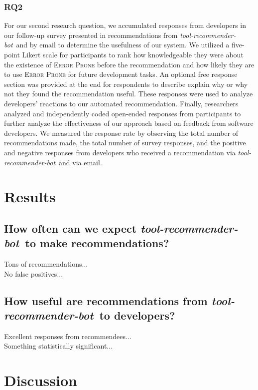 \documentclass[sigconf,review,anonymous]{acmart}
\newcommand{\tool}{\textsl{tool-recommender-bot}}
\begin{document}
\subsubsection{RQ2}

For our second research question, we accumulated responses from developers in our follow-up survey presented in recommendations from \tool~and by email to determine the usefulness of our system. We utilized a five-point Likert scale for participants to rank how knowledgeable they were about the existence of \textsc{Error Prone} before the recommendation and how likely they are to use \textsc{Error Prone} for future development tasks. An optional free response section was provided at the end for respondents to describe explain why or why not they found the recommendation useful. These responses were used to analyze developers' reactions to our automated recommendation. Finally, researchers analyzed and independently coded open-ended responses from participants to further analyze the effectiveness of our approach based on feedback from software developers. We measured the response rate by observing the total number of recommendations made, the total number of survey responses, and the positive and negative responses from developers who received a recommendation via \tool~and via email.

\section{Results}

\subsection{How often can we expect \tool~to make recommendations?}

Tons of recommendations... \\

No false positives...

\subsection{How useful are recommendations from \tool~to developers?}

Excellent responses from recommendees...\\

Something statistically significant...

\section{Discussion}
\end{document}

